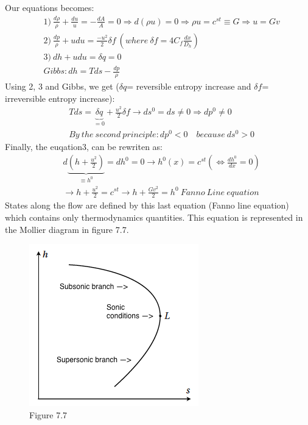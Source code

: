 Our equations becomes:
 \begin{equation}
\begin{aligned}
&1)\ \frac{d\rho}{\rho}+\frac{du}{u}=-\frac{dA}{A}=0 \Rightarrow d(\rho u)=0 \Rightarrow \rho u=c^{st} \equiv G \Rightarrow u=Gv \\
&2)\ \frac{dp}{\rho}+udu=\frac{-u^2}{2} \delta f \ (where \ \delta f =4C_f\frac{dx}{D_h} ) \\
&3)\ dh+udu=\delta q=0 \\
& Gibbs: dh=Tds-\frac{dp}{\rho}
\end{aligned} 
\end{equation}
Using 2, 3 and Gibbs, we get ($\delta q$= reversible entropy increase and $\delta f$= irreversible entropy increase):
 \begin{equation}
\begin{aligned}
&Tds=\underbrace{\delta q}_{=0}+\frac{u^2}{2}\delta f \rightarrow ds^0=ds \neq 0 \Rightarrow dp^0 \neq 0 \\
&By\ the\ second\ principle: dp^0<0\quad because\ ds^0>0
\end{aligned} 
\end{equation}
Finally, the euqation3, can be rewriten as:
 \begin{equation}
\begin{aligned}
&d \underbrace{(h+\frac{u^2}{2})}_{\equiv h^0}=dh^0=0 \rightarrow h^0(x)=c^{st} (\Leftrightarrow \frac{dh^0}{dx}=0) \\
& \rightarrow h+\frac{u^2}{2}=c^{st} \rightarrow h+\frac{Gv^2}{2}=h^0 \ Fanno\ Line\ equation
\end{aligned} 
\end{equation}
States along the flow are defined by this last equation (Fanno line equation) which contains only thermodynamics quantities. This equation is represented in the Mollier diagram in figure 7.7.

\begin{figure}[H]
\begin{center}
\includegraphics[scale=0.45]{ch7/chap77.png}
\caption*{Figure 7.7}
\end{center}
\end{figure}

